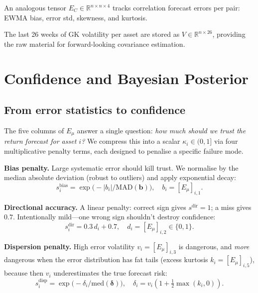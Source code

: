 \documentclass[10pt,twocolumn]{article}
\newcommand{\R}{\mathbb{R}}
\newcommand{\MAD}{\mathrm{MAD}}
\begin{document}
An analogous tensor $E_C\in\R^{n\times n\times 4}$ tracks
correlation forecast errors per pair: EWMA bias, error std,
skewness, and kurtosis.

The last 26 weeks of GK volatility per asset are stored as
$V\in\R^{n\times 26}$, providing the raw material for
forward-looking covariance estimation.

\FloatBarrier
\section{Confidence and Bayesian Posterior}\label{sec:confidence}

\subsection{From error statistics to confidence}

The five columns of $E_\mu$ answer a single question: \emph{how much
should we trust the return forecast for asset $i$?}  We compress
this into a scalar $\kappa_i\in(0,1]$ via four multiplicative
penalty terms, each designed to penalise a specific failure mode.

\textbf{Bias penalty.}
Large systematic error should kill trust.  We normalise by the
median absolute deviation (robust to outliers) and apply exponential
decay:
\begin{equation}\label{eq:sbias}
s_i^{\mathrm{bias}} = \exp\!\big({-}|b_i|/\MAD(\bm{b})\big),
\quad b_i=[E_\mu]_{i,1}.
\end{equation}

\textbf{Directional accuracy.}
A linear penalty: correct sign gives $s^{\mathrm{dir}}=1$;
a miss gives $0.7$.  Intentionally mild---one wrong sign
shouldn't destroy confidence:
\begin{equation}\label{eq:sdir}
s_i^{\mathrm{dir}} = 0.3\,d_i + 0.7,
\quad d_i=[E_\mu]_{i,2}\in\{0,1\}.
\end{equation}

\textbf{Dispersion penalty.}
High error volatility $v_i=[E_\mu]_{i,3}$ is dangerous, and
\emph{more} dangerous when the error distribution has fat tails
(excess kurtosis $k_i=[E_\mu]_{i,5}$), because then $v_i$
underestimates the true forecast risk:
\begin{equation}\label{eq:sdisp}
s_i^{\mathrm{disp}} = \exp\!\big({-}\delta_i/\mathrm{med}(\bm\delta)\big),
\quad \delta_i = v_i(1{+}\tfrac{1}{2}\max(k_i,0)).
\end{equation}
\end{document}
